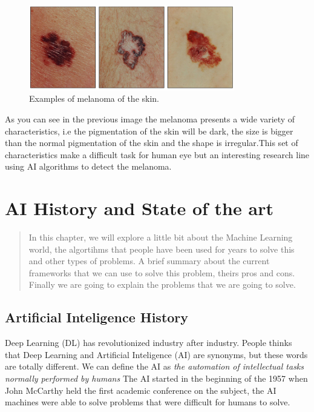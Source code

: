\begin{figure}[H]
\centering
\includegraphics[width=0.8\textwidth]{./figures/melanoma-examples.jpg}
\caption{Examples of melanoma of the skin. \cite{melanoma-stadistics}}
\end{figure}

As you can see in the previous image the melanoma presents a wide variety of characteristics, i.e the pigmentation of the skin will be dark, the size is bigger than the normal pigmentation of the skin and the shape is irregular.This set of characteristics make a difficult task for human eye but an interesting research line using AI algorithms to detect the melanoma. 


\chapter{AI History and State of the art}

\begin{abstract}
In this chapter, we will explore a little bit about the 
Machine Learning world, the algortihms that people have
been used for years to solve this and other types of problems. A brief summary about the current frameworks that we can use to solve this problem, theirs pros and cons. Finally we are going to explain the problems that we are going to solve. 
\end{abstract}


\section{Artificial Inteligence History}

Deep Learning (DL) has revolutionized industry after industry. People thinks that Deep Learning and Artificial Inteligence (AI) are synonyms, but these words are totally different.
We can define the AI as \emph{the automation of intellectual tasks normally performed by humans}
The AI started in the beginning of the 1957 when John McCarthy held the first academic conference on the subject, the AI machines were able to solve problems that were difficult for humans to solve.


